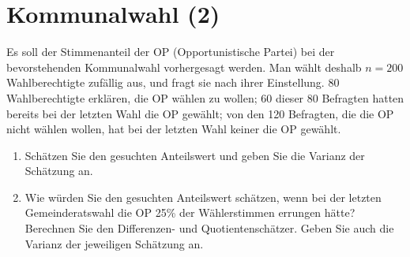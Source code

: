 \documentclass{article}
\begin{document}
\section{Kommunalwahl (2)}
Es soll der Stimmenanteil der OP (Opportunistische Partei) bei der bevorstehenden Kommunalwahl vorhergesagt werden. Man wählt deshalb $n=200$ Wahlberechtigte zufällig aus, und fragt sie nach ihrer Einstellung. 80 Wahlberechtigte erklären, die OP wählen zu wollen; 60 dieser 80 Befragten hatten bereits bei der letzten Wahl die OP gewählt; von den 120 Befragten, die die OP nicht wählen wollen, hat bei der letzten Wahl keiner die OP gewählt.
\begin{enumerate}
\item Schätzen Sie den gesuchten Anteilswert und geben Sie die Varianz der Schätzung an.
\item Wie würden Sie den gesuchten Anteilswert schätzen, wenn bei der letzten Gemeinderatswahl die OP 25\% der Wählerstimmen errungen hätte? Berechnen Sie den Differenzen- und Quotientenschätzer. Geben Sie auch die Varianz der jeweiligen Schätzung an.
\end{enumerate}
\end{document}
